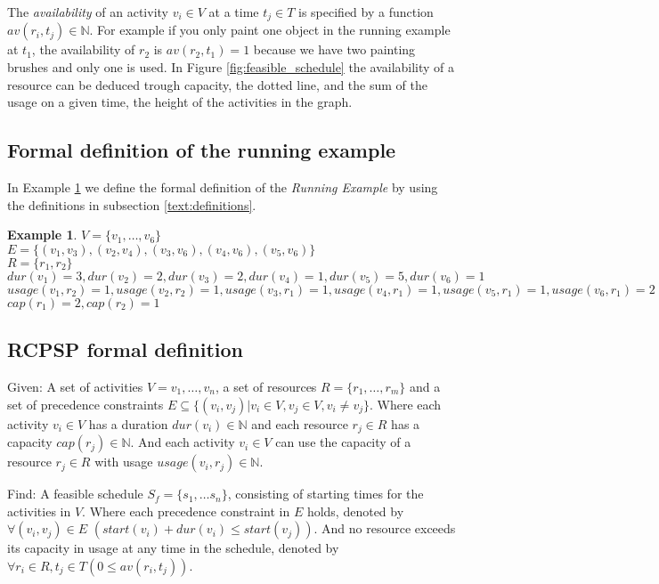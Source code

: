 \documentclass{article}
\theoremstyle{definition}
\newtheorem{example}{Example}[section]
\newcommand{\av}[2]{\ensuremath{av(r_{#1}, t_{#2})}} %
\newcommand{\capa}[1]{\ensuremath{cap(r_{#1})}} %
\newcommand{\dur}[1]{\ensuremath{dur(v_{#1})}} %
\newcommand{\usage}[2]{\ensuremath{usage(v_{#1}, r_{#2})}} %
\newcommand{\start}[1]{\ensuremath{start(v_{#1})}} %
\newenvironment{definition}[1][Definition]{\begin{trivlist}
\item[\hskip \labelsep {\bfseries #1}]}{\end{trivlist}}
\begin{document}
The \emph{availability} of an activity $v_i \in V$ at a time $t_j \in T$ is specified by a function $\av{i}{j} \in \mathbb{N}$.
For example if you only paint one object in the running example at $t_1$, the availability of $r_2$ is $\av{2}{1} = 1$ because we have two painting brushes and only one is used.
In Figure \ref{fig:feasible_schedule} the availability of a resource can be deduced trough capacity, the dotted line, and the sum of the usage on a given time, the height of the activities in the graph. 

\subsection{Formal definition of the running example}
\label{text:running_example_definition}

In Example \ref{exmp:running} we define the formal definition of the \emph{Running Example} by using the definitions in subsection \ref{text:definitions}.
\begin{example}
\label{exmp:running}
$V = \{v_1, \ldots, v_6\}$\\
$E = \{(v_1, v_3), (v_2, v_4), (v_3, v_6), (v_4, v_6), (v_5, v_6)\}$\\
$R = \{r_1, r_2\}$\\
$\dur{1} = 3, \dur{2} = 2, \dur{3} = 2, \dur{4} = 1, \dur{5} = 5, \dur{6} = 1$\\
$\usage{1}{2} = 1, \usage{2}{2} = 1, \usage{3}{1} = 1, \usage{4}{1} = 1, \usage{5}{1} = 1, \usage{6}{1} = 2$\\
$\capa{1} = 2, \capa{2} = 1$
\end{example}


\subsection{RCPSP formal definition}
\label{text:RCPSP_definition}

\begin{definition}
Given:
A set of activities $V = v_1, \ldots, v_n$, a set of resources $R = \{r_1, \ldots, r_m\}$ and a set of precedence constraints $E \subseteq  \{(v_i, v_j) | v_i \in V, v_j \in V, v_i \neq v_j\}$.
Where each activity $v_i \in V$ has a duration $\dur{i} \in \mathbb{N}$ and each resource $r_j \in R$ has a capacity $\capa{j} \in \mathbb{N}$. 
And each activity $v_i \in V$ can use the capacity of a resource $r_j \in R$ with usage $\usage{i}{j} \in \mathbb{N}$.

Find:
A feasible schedule $S_f = \{s_1, \ldots s_n\}$, consisting of starting times for the activities in $V$.
Where each precedence constraint in $E$ holds, denoted by $\forall (v_i, v_j) \in E$ $(\start{i} + \dur{i} \leq \start{j})$.
And no resource exceeds its capacity in usage at any time in the schedule, denoted by $\forall r_i \in R, t_j \in T (0 \leq \av{i}{j})$.
\end{definition}
\end{document}
